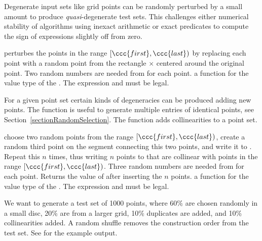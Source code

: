 
Degenerate input sets like grid points can be randomly perturbed by a
small amount to produce {\em quasi}-degenerate test sets. This
challenges either numerical stability of algorithms using inexact
arithmetic or exact predicates to compute the sign of expressions
slightly off from zero. 

{ perturbes the points in the range $[\ccc{first},\ccc{last})$ by
  replacing each point with a random point from the rectangle
   $\times$  centered around the original point.
  Two random numbers are needed from  for each point.
  \ccPrecond a function  for the value type of
    the . 
    The expression  and
     must be legal. 
}


For a given point set certain kinds of degeneracies can be produced
adding new points. The  function is
useful to generate multiple entries of identical points, see
Section~\ref{sectionRandomSelection}. The
 function adds collinearities to
a point set.


{ choose two random points from the range $[\ccc{first},\ccc{last})$,
    create a random third point on the segment connecting this two
    points, and write it to . Repeat this $n$ times, thus
    writing $n$ points to  that are collinear with points
    in the range $[\ccc{first},\ccc{last})$.
    Three random numbers are needed from  for each point.
    Returns the value of  after inserting the $n$ points.
  \ccPrecond a function  for the value type of
    the . 
    The expression  and
     must be legal. 
}

\ccExample

We want to generate a test set of 1000 points, where 60\% are chosen
randomly in a small disc, 20\% are from a larger grid, 10\% duplicates
are added, and 10\% collinearities added. A random shuffle removes the
construction order from the test set. See  for the example output.

